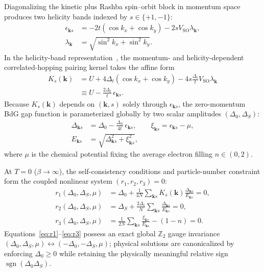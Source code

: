 \documentclass[aps,prb,twocolumn,superscriptaddress,longbibliography,floatfix]{revtex4-2}
\newcommand{\SO}{V_{\mathrm{SO}}}
\newcommand{\ks}{\mathbf{k}s}
\newcommand{\sgn}{\operatorname{sgn}}
\begin{document}
Diagonalizing the kinetic plus Rashba spin--orbit block in momentum space produces two helicity bands indexed by $s\in\{+1,-1\}$:
\begin{align}
\epsilon_{\ks} &= -2t(\cos k_x + \cos k_y) - 2s\SO\lambda_{\mathbf{k}}, \nonumber\\
\lambda_{\mathbf{k}} &= \sqrt{\sin^2 k_x + \sin^2 k_y}.
\label{eq:eps_ks}
\end{align}
In the helicity-band representation~\cite{Hutchinson2018}, the momentum- and helicity-dependent correlated-hopping pairing kernel takes the affine form
\begin{align}
K_s(\mathbf{k}) &= U + 4\Delta_t(\cos k_x + \cos k_y) - 4s\frac{\Delta_t}{t}\SO\lambda_{\mathbf{k}} \nonumber\\
&\equiv U - \frac{2\Delta_t}{t}\,\epsilon_{\ks}.
\label{eq:kernel}
\end{align}
Because $K_s(\mathbf{k})$ depends on $(\mathbf{k},s)$ solely through $\epsilon_{\ks}$, the zero-momentum BdG gap function is parameterized globally by two scalar amplitudes $(\Delta_0,\Delta_S)$:
\begin{align}
\Delta_{\ks} &= \Delta_0 - \frac{\Delta_S}{4t}\,\epsilon_{\ks},
\qquad
\xi_{\ks} = \epsilon_{\ks} - \mu, \nonumber\\
E_{\ks} &= \sqrt{\Delta_{\ks}^2 + \xi_{\ks}^2},
\label{eq:gap_quasiparticle}
\end{align}
where $\mu$ is the chemical potential fixing the average electron filling $n\in(0,2)$.

At $T=0$ ($\beta\to\infty$), the self-consistency conditions and particle-number constraint form the coupled nonlinear system $(r_1,r_2,r_3)=0$:
\begin{align}
r_1(\Delta_0,\Delta_S,\mu) &= \Delta_0 + \frac{1}{4N}\sum_{\ks} K_s(\mathbf{k})\frac{\Delta_{\ks}}{E_{\ks}} = 0, \label{eq:r1}\\
r_2(\Delta_0,\Delta_S,\mu) &= \Delta_S + \frac{2\Delta_t}{N}\sum_{\ks} \frac{\Delta_{\ks}}{E_{\ks}} = 0, \label{eq:r2}\\
r_3(\Delta_0,\Delta_S,\mu) &= \frac{1}{2N}\sum_{\ks} \frac{\xi_{\ks}}{E_{\ks}} - (1 - n) = 0. \label{eq:r3}
\end{align}
Equations~\eqref{eq:r1}--\eqref{eq:r3} possess an exact global $\mathbb{Z}_2$ gauge invariance $(\Delta_0,\Delta_S,\mu)\leftrightarrow(-\Delta_0,-\Delta_S,\mu)$; physical solutions are canonicalized by enforcing $\Delta_0\ge 0$ while retaining the physically meaningful relative sign $\sgn(\Delta_0\Delta_S)$.
\end{document}
